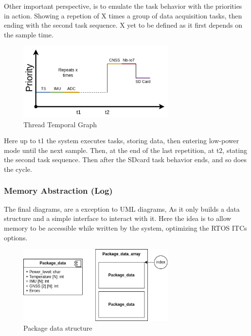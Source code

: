 Other important perspective, is to emulate the task behavior with the priorities in action. 
Showing a repetion of X times a group of data acquisition tasks, then ending with the second task sequence.
X yet to be defined as it first depends on the sample time. 
\begin{figure}[H]
    \centering
    \includegraphics[width=0.7\textwidth]{images/diagrams/threads/graph/threads_graph.drawio.png}  %
    \caption{Thread Temporal Graph}
    \label{fig:Thread Temporal Graph}        
\end{figure}

Here up to t1 the system executes tasks, storing data, then entering low-power mode until the next sample.
Then, at the end of the last repetition, at t2, stating the second task sequence. Then after the SDcard task behavior ends, and so does the cycle.
\subsubsection{Memory Abstraction (Log)} 

The final diagrams, are a exception to UML diagrams, As it only builds a data structure and a simple interface to interact with it.
Here the idea is to allow memory to be accessible while written by the system, optimizing the RTOS ITCs options.
\begin{figure}[H]
    \centering
    \includegraphics[width=0.7\textwidth]{images/diagrams/data_struct/package_data.drawio.png}  %
    \caption{Package data structure}
    \label{fig:Package data structure}        
\end{figure}


